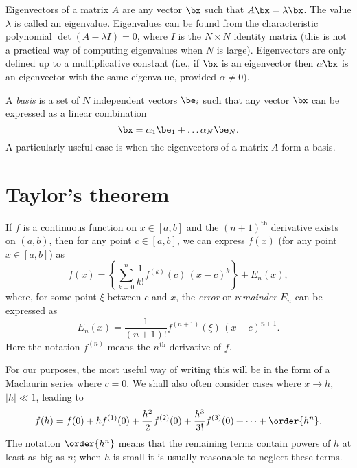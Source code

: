 Eigenvectors of a matrix $A$ are any vector $\bx$ such that $A \bx =
\lambda \bx$. The value $\lambda$ is called an eigenvalue. Eigenvalues
can be found from the characteristic polynomial $\det(A - \lambda I) =
0$, where $I$ is the $N \times N$ identity matrix (this is not a
practical way of computing eigenvalues when $N$ is
large). Eigenvectors are only defined up to a multiplicative constant
(i.e., if $\bx$ is an eigenvector then $\alpha \bx$ is an eigenvector
with the same eigenvalue, provided $\alpha \ne 0$).

A \emph{basis} is a set of $N$ independent vectors $\be_i$ such that
any vector $\bx$ can be expressed as a linear combination
%
\begin{equation}
  \label{eq:key_la4}
  \bx = \alpha_1 \be_1 + \dots \alpha_N \be_N.
\end{equation}
%
A particularly useful case is when the eigenvectors of a matrix $A$
form a basis.

\section{Taylor's theorem}

If $f$ is a continuous function on $x \in [a, b]$ and the
$(n+1)^{\text{th}}$ derivative exists on $(a, b)$, then for any point
$c \in [a, b]$, we can express $f(x)$ (for any point $x \in [a, b]$)
as
%
\begin{equation}
  \label{eq:key_taylor}
  f(x) = \left\{\sum_{k=0}^n \frac{1}{k!} f^{(k)}(c) \, (x - c)^k
  \right\} + E_n(x),
\end{equation}
%
where, for some point $\xi$ between $c$ and $x$, the \emph{error} or
\emph{remainder} $E_n$ can be expressed as
%
\begin{equation}
  \label{eq:key_taylor2}
  E_n(x) = \frac{1}{(n+1)!} f^{(n+1)}(\xi) \, (x - c)^{n+1}.
\end{equation}
%
Here the notation $f^{(n)}$ means the $n^{\text{th}}$ derivative of
$f$.

For our purposes, the most useful way of writing this will be in the
form of a Maclaurin series where $c=0$. We shall also often consider
cases where $x \rightarrow h$, $|h| \ll 1$, leading to
%
\begin{equation}
  \label{eq:key_taylor3}
  f(h) = f(0) + h f^{(1)}(0) + \frac{h^2}{2} f^{(2)}(0) +
  \frac{h^3}{3!} f^{(3)}(0) + \dots + \order{h^n}.
\end{equation}
%
The notation $\order{h^n}$ means that the remaining terms contain
powers of $h$ at least as big as $n$; when $h$ is small it is usually
reasonable to neglect these terms.

